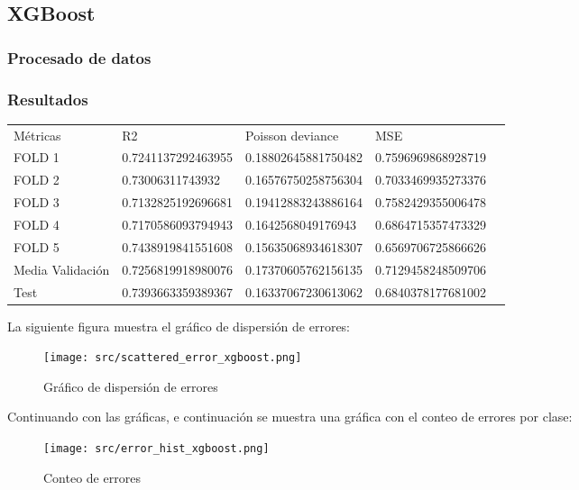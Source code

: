 \subsection{XGBoost}
\subsubsection{Procesado de datos}
\subsubsection{Resultados}
\begin{table}[htbp]
	\begin{tabular}{|l|l|l|l|l}
		\cline{1-4}
		Métricas & R2                  & Poisson deviance     & MSE               \\ \cline{1-4}
		FOLD 1    & 0.7241137292463955 & 0.18802645881750482 & 0.7596969868928719 \\ \cline{1-4}
		FOLD 2    & 0.73006311743932   & 0.16576750258756304 & 0.7033469935273376 \\ \cline{1-4}
		FOLD 3    & 0.7132825192696681 & 0.19412883243886164 & 0.7582429355006478 \\ \cline{1-4}
		FOLD 4    & 0.7170586093794943 & 0.1642568049176943  & 0.6864715357473329 \\ \cline{1-4}
		FOLD 5    & 0.7438919841551608 & 0.15635068934618307 & 0.6569706725866626 \\ \cline{1-4}
		Media Validación    & 0.7256819918980076 & 0.17370605762156135 & 0.7129458248509706 \\ \cline{1-4}
		Test      & 0.7393663359389367 & 0.16337067230613062 & 0.6840378177681002 \\ \cline{1-4}
	\end{tabular}
\end{table}
La siguiente figura muestra el gráfico de dispersión de errores:
\begin{figure}[H]
	\centering
	\texttt{[image: src/scattered\_error\_xgboost.png]}
	\caption{Gráfico de dispersión de errores}
	\label{fig:xgboost_scattered}
\end{figure}
Continuando con las gráficas, e continuación se muestra una gráfica con el conteo de errores por clase:\\
\linebreak
\begin{figure}[H]
	\centering
	\texttt{[image: src/error\_hist\_xgboost.png]}
	\caption{Conteo de errores}
	\label{fig:xgboost_error_plot}
\end{figure}
